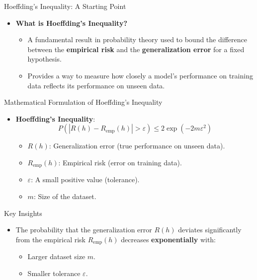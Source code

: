 \documentclass[
  ignorenonframetext,
]{beamer}
\providecommand{\tightlist}{%
  \setlength{\itemsep}{0pt}\setlength{\parskip}{0pt}}\usepackage{longtable,booktabs,array}
\begin{document}
\begin{frame}{Hoeffding's Inequality: A Starting Point}
\label{hoeffdings-inequality-a-starting-point}
\begin{itemize}
\tightlist
\item
  \textbf{What is Hoeffding's Inequality?}

  \begin{itemize}
  \tightlist
  \item
    A fundamental result in probability theory used to bound the
    difference between the \textbf{empirical risk} and the
    \textbf{generalization error} for a fixed hypothesis.
  \item
    Provides a way to measure how closely a model's performance on
    training data reflects its performance on unseen data.
  \end{itemize}
\end{itemize}
\end{frame}

\begin{frame}{Mathematical Formulation of Hoeffding's Inequality}
\label{mathematical-formulation-of-hoeffdings-inequality}
\begin{itemize}
\tightlist
\item
  \textbf{Hoeffding's Inequality}: \[
  P(|R(h) - R_{\text{emp}}(h)| > \varepsilon) \leq 2 \exp(-2m\varepsilon^2)
  \]

  \begin{itemize}
  \tightlist
  \item
    \(R(h)\): Generalization error (true performance on unseen data).
  \item
    \(R_{\text{emp}}(h)\): Empirical risk (error on training data).
  \item
    \(\varepsilon\): A small positive value (tolerance).
  \item
    \(m\): Size of the dataset.
  \end{itemize}
\end{itemize}
\end{frame}

\begin{frame}
\begin{block}{Key Insights}
\label{key-insights-1}
\begin{itemize}
\tightlist
\item
  The probability that the generalization error \(R(h)\) deviates
  significantly from the empirical risk \(R_{\text{emp}}(h)\) decreases
  \textbf{exponentially} with:

  \begin{itemize}
  \tightlist
  \item
    Larger dataset size \(m\).
  \item
    Smaller tolerance \(\varepsilon\).
  \end{itemize}
\end{itemize}
\end{block}
\end{frame}
\end{document}
